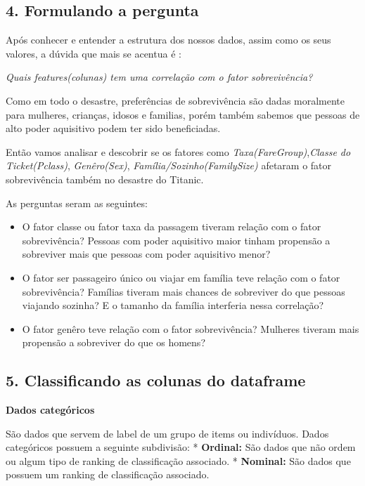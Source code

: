 \documentclass[11pt]{article}
\providecommand{\tightlist}{%
      \setlength{\itemsep}{0pt}\setlength{\parskip}{0pt}}
\begin{document}
    \subsection{4. Formulando a pergunta}\label{formulando-a-pergunta}

Após conhecer e entender a estrutura dos nossos dados, assim como os
seus valores, a dúvida que mais se acentua é :

\emph{Quais features(colunas) tem uma correlação com o fator
sobrevivência?}

Como em todo o desastre, preferências de sobrevivência são dadas
moralmente para mulheres, crianças, idosos e familias, porém também
sabemos que pessoas de alto poder aquisitivo podem ter sido
beneficiadas.

Então vamos analisar e descobrir se os fatores como
\emph{Taxa(FareGroup)},\emph{Classe do Ticket(Pclass)},
\emph{Genêro(Sex)}, \emph{Família/Sozinho(FamilySize)} afetaram o fator
sobrevivência também no desastre do Titanic.

As perguntas seram as seguintes:

\begin{itemize}
\tightlist
\item
  O fator classe ou fator taxa da passagem tiveram relação com o fator
  sobrevivência? Pessoas com poder aquisitivo maior tinham propensão a
  sobreviver mais que pessoas com poder aquisitivo menor?
\item
  O fator ser passageiro único ou viajar em família teve relação com o
  fator sobrevivência? Famílias tiveram mais chances de sobreviver do
  que pessoas viajando sozinha? E o tamanho da família interferia nessa
  correlação?
\item
  O fator genêro teve relação com o fator sobrevivência? Mulheres
  tiveram mais propensão a sobreviver do que os homens?
\end{itemize}

    \subsection{5. Classificando as colunas do
dataframe}\label{classificando-as-colunas-do-dataframe}

\textbf{Dados categóricos}

São dados que servem de label de um grupo de items ou indivíduos. Dados
categóricos possuem a seguinte subdivisão: * \textbf{Ordinal: } São
dados que não ordem ou algum tipo de ranking de classificação associado.
* \textbf{Nominal: } São dados que possuem um ranking de classificação
associado.
\end{document}
